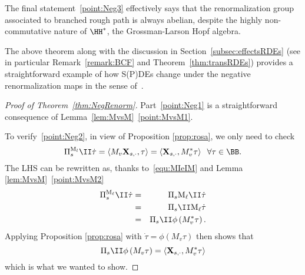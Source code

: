 \documentclass{article}
\begin{document}
\begin{remark}
The final statement~\ref{point:Neg3} effectively says that the renormalization group associated to branched rough path is always abelian, despite the highly non-commutative nature of $\HH^*$, the Grossman-Larson Hopf algebra.
\end{remark}

\begin{remark}
The above theorem along with the discussion in Section~\ref{subsec:effectsRDEs} (see in particular Remark~\ref{remark:BCF} and Theorem~\ref{thm:transRDEs}) provides a straightforward example of how S(P)DEs change under the negative renormalization maps in the sense of~\cite{BHZ16}.
\end{remark}

\begin{proof}[Proof of Theorem~\ref{thm:NegRenorm}]
Part~\ref{point:Neg1} is a straightforward consequence of Lemma~\ref{lem:MvsM}~\ref{point:MvsM1}.

To verify~\ref{point:Neg2}, in view of Proposition \ref{prop:rosa}, we only need to check
\[
\Pi _{s}^{\mathrm{M}_{l}}\II\dot{\tau}=\left\langle M_{v}\mathbf{X}_{s,\cdot
},\tau \right\rangle =\left\langle \mathbf{X}_{s,\cdot },M_{v}^{\ast }\tau
\right\rangle  \; \; \forall \tau \in \BB.
\]%
The LHS can be rewritten as, thanks to~\eqref{equ:MIeIM} and Lemma \ref{lem:MvsM}~\ref{point:MvsM2}
\begin{eqnarray*}
\Pi _{s}^{\mathrm{M}_{\ell}}\II\dot{\tau} &=&\Pi _{s}\mathrm{M}_{\ell}\II\dot{\tau} \\
&=&\Pi _{s}\II \mathrm{M}_{\ell}\dot{\tau} \\
&=&\Pi _{s}\II \phi \left( M^*_{v}\tau \right).
\end{eqnarray*}%
Applying Proposition \ref{prop:rosa} with $\dot\tau = \phi \left( M_{v}\tau \right) $ then shows
that 
\[
\Pi _{s}\II \phi \left( M_{v}\tau \right) =\left\langle \mathbf{X}_{s,\cdot
},M_{v}^{\ast }\tau \right\rangle 
\]%
which is what we wanted to show.


%
%
%


\end{proof}
\end{document}
